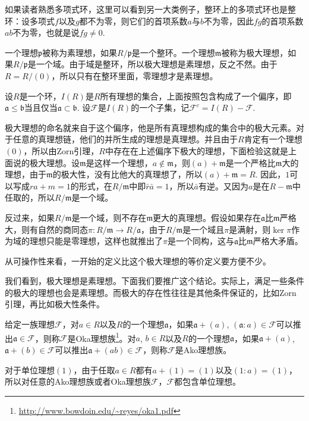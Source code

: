 如果读者熟悉多项式环，这里可以看到另一大类例子，整环上的多项式环也是整环：设多项式$f$以及$g$都不为零，则它们的首项系数$a$与$b$不为零，因此$fg$的首项系数$ab$不为零，也就是说$fg\neq 0$.

\para 一个理想$\mathfrak{p}$被称为素理想，如果$R/\mathfrak{p}$是一个整环。一个理想$\mathfrak{m}$被称为极大理想，如果$R/\mathfrak{p}$是一个域。由于域是整环，所以极大理想是素理想，反之不然。由于$R=R/(0)$，所以只有在整环里面，零理想才是素理想。

\para 设$R$是一个环，$I(R)$是$R$所有理想的集合，上面按照包含构成了一个偏序，即$\mathfrak{a}\leq \mathfrak{b}$当且仅当$\mathfrak{a}\subset \mathfrak{b}$. 设$\mathcal{F}$是$I(R)$的一个子集，记$\mathcal{F}^c=I(R)-\mathcal{F}$.

极大理想的命名就来自于这个偏序，他是所有真理想构成的集合中的极大元素。对于任意的真理想链，他们的并所生成的理想是真理想。并且由于$R$肯定有一个理想$(0)$，所以由Zorn引理，$R$中存在在上述偏序下极大的理想，下面检验这就是上面说的极大理想。设$\mathfrak{m}$是这样一个理想，$a\notin \mathfrak{m}$，则$(a)+\mathfrak{m}$是一个严格比$\mathfrak{m}$大的理想，由于$\mathfrak{m}$的极大性，没有比他大的真理想了，所以$(a)+\mathfrak{m}=R$. 因此，$1$可以写成$ra+m=1$的形式，在$R/\mathfrak{m}$中即$\bar{r}\bar{a}=1$，所以$\bar{a}$有逆。又因为$a$是在$R-\mathfrak{m}$中任取的，所以$R/\mathfrak{m}$是一个域。

反过来，如果$R/\mathfrak{m}$是一个域，则不存在$\mathfrak{m}$更大的真理想。假设如果存在$\mathfrak{a}$比$\mathfrak{m}$严格大，则有自然的商同态$\pi:R/\mathfrak{m}\to R/\mathfrak{a}$，由于$R/\mathfrak{m}$是一个域且$\pi$是满射，则$\ker \pi$作为域的理想只能是零理想，这样也就推出了$\pi$是一个同构，这与$\mathfrak{a}$比$\mathfrak{m}$严格大矛盾。

从可操作性来看，一开始的定义比这个极大理想的等价定义要方便不少。

\para \label{oka}我们看到，极大理想是素理想。下面我们要推广这个结论。实际上，满足一些条件的极大的理想也会是素理想。而极大的存在性往往是其他条件保证的，比如Zorn引理，再比如极大性条件。

给定一族理想$\mathcal{F}$，对$a\in R$以及$R$的一个理想$\mathfrak{a}$，如果$\mathfrak{a}+(a)$, $(\mathfrak{a}:a)\in \mathcal{F}$可以推出$\mathfrak{a}\in \mathcal{F}$，则称$\mathcal{F}$是Oka理想族\footnote{\url{http://www.bowdoin.edu/~reyes/oka1.pdf}}。对$a$, $b\in R$以及$R$的一个理想$\mathfrak{a}$，如果$\mathfrak{a}+(a)$, $\mathfrak{a}+(b)\in \mathcal{F}$可以推出$\mathfrak{a}+(ab)\in \mathcal{F}$，则称$\mathcal{F}$是Ako理想族。

对于单位理想$(1)$，由于任取$a\in R$都有$a+(1)=(1)$以及$(1:a)=(1)$，所以对任意的Ako理想族或者Oka理想族$\mathcal{F}$，$\mathcal{F}$都包含单位理想。

